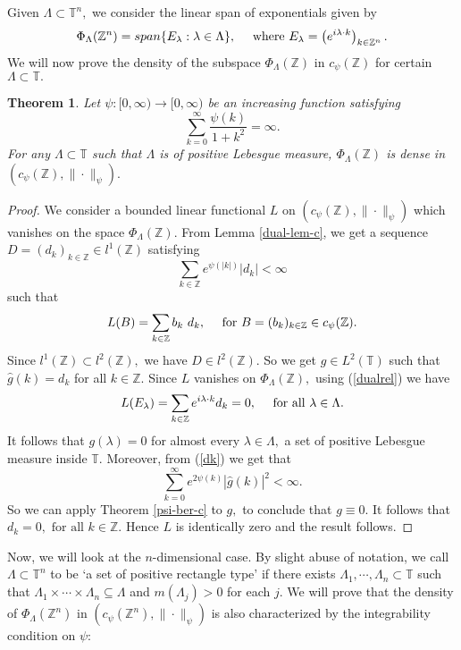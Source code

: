 \documentclass [11pt]{amsart}
\newtheorem{Thm}{Theorem}[section]
\newcommand{\T}{\mathbb T}
\newcommand{\Z}{\mathbb Z}
\newcommand{\la}{\lambda}
\newcommand{\txt} {\textmd}
\newcommand{\ds} {\displaystyle}
\newcommand{\be} {\begin{equation}}
\newcommand{\ee} {\end{equation}}
\newcommand{\bes} {\begin{equation*}}
\newcommand{\ees} {\end{equation*}}
\numberwithin{equation}{section}
\begin{document}
Given $\Lambda \subset \T^n,$ we consider the linear span of exponentials given by 
$$\Phi_{\Lambda}(\Z^n)= span \lbrace E_{\la}: \la \in \Lambda \rbrace, \quad \txt{ where } E_\lambda=\left(e^{i\la \cdot k}\right)_{k\in\Z^n}.$$ 
We will now prove the density of the subspace $\Phi_{\Lambda}(\Z)$ in $c_{\psi}(\Z)$ for certain $\Lambda \subset \T.$
\begin{Thm}\label{density-c}
	Let $\psi:[0,\infty) \rightarrow [0,\infty)$ be an increasing function satisfying 
	\bes \sum_{k=0}^\infty\dfrac{\psi(k)}{1+k^2} = \infty. \ees
	For any $\Lambda \subset \T$ such that $\Lambda$ is of positive Lebesgue measure, $\Phi_{\Lambda}(\Z)$ is dense in $(c_{\psi}(\Z),\|\cdot \|_{\psi}).$
\end{Thm}
 
\begin{proof}
	We consider a bounded linear functional $L$ on $(c_{\psi}(\Z),\|\cdot \|_{\psi})$ which vanishes on the space $\Phi_{\Lambda}(\Z).$ From Lemma \ref{dual-lem-c}, we get a sequence $D=(d_k)_{k\in\Z} \in l^1(\Z)$ satisfying 
\be \label{dk} \ds{\sum_{k\in\Z}e^{\psi(|k|)}|d_k|<\infty} \ee such that
	\be \label{dualrel}  L(B)=\sum_{k\in\Z} b_k~d_k, \quad \txt{ for } B=(b_k)_{k\in\Z} \in c_{\psi}(\Z). \ee
Since $l^1(\Z)\subset l^2(\Z),$ we have $D \in l^2(\Z).$ So we get $g \in L^2(\T)$ such that $\widehat{g}(k) = d_k$ for all $k \in \Z.$ Since $L$ vanishes on $\Phi_{\Lambda}(\Z),$ using (\ref{dualrel}) we have $$L(E_\la) = \sum_{k\in\Z} e^{i\lambda \cdot k}d_k=0, \quad \txt{ for all } \lambda\in \Lambda .$$ It follows that $g(\la) = 0$ for almost every $\la \in \Lambda,$ a set of positive Lebesgue measure inside $\T.$ Moreover, from (\ref{dk}) we get that  
    $$ \sum_{k=0}^\infty e^{2\psi(k)}|\widehat{g}(k)|^2<\infty .$$
So we can apply Theorem \ref{psi-ber-c} to $g,$ to conclude that $g\equiv 0.$ It follows that $d_k=0,\text{ for all } k \in \Z.$ Hence $L$ is identically zero and the result follows.
\end{proof}

\vspace{0.1in}

Now, we will look at the $n$-dimensional case. By slight abuse of notation, we call $\Lambda \subset \T^n$ to be `a set of positive rectangle type' if there exists $\Lambda_1,\cdots ,\Lambda_n\subset \T$ such that $\Lambda_1\times \cdots \times \Lambda_n \subseteq \Lambda$ and $m(\Lambda_j)>0$ for each $j.$ We will prove that the density of  $\Phi_\Lambda(\Z^n)$ in $(c_\psi(\Z^n),\|\cdot\|_\psi)$ is also characterized by the integrability condition on $\psi:$
\end{document}
